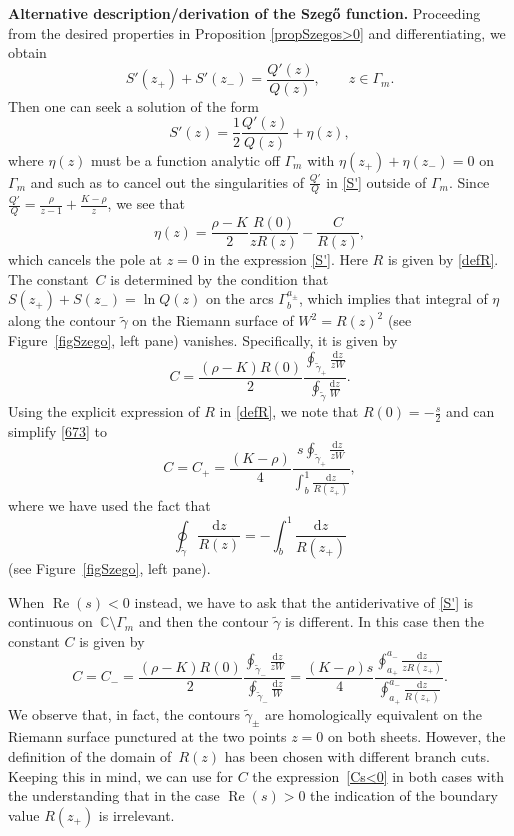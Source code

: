 \documentclass[10pt,a4paper]{amsart}
\numberwithin{equation}{section}
\theoremstyle{definition}
\def \wt{ \widetilde }
\def \d{{\mathrm d}}
\def\be{\begin{equation}}
\def\ee{\end{equation}}
\def\C{{\mathbb C}}
\def \Re{\operatorname{Re} }
\def\la{\label}
\begin{document}
{\bf Alternative description/derivation of the Szeg\H{o} function.}
Proceeding from the desired properties in Proposition \eqref{propSzegos>0} and differentiating, we obtain
\[
S'(z_+)+S'(z_-) = \frac {Q'(z)}{Q(z)}, \qquad z\in \Gamma_m.
\]
Then one can seek a solution of the form
\be
\label{S'}
S'(z)=\frac 1 2 \frac {Q'(z)}{Q(z)} + \eta(z),
\ee
where $\eta(z)$ must be a function analytic off $\Gamma_m$ with $\eta(z_+)+ \eta(z_-)= 0$ on $\Gamma_m$ and such as to cancel out the singularities of $\frac {Q'}Q$ in \eqref{S'} outside of $\Gamma_m$.
Since $\frac {Q'}Q = \frac { {\rho}}{z-1} + \frac{ {K} - {\rho}} z$, we see that
\[
\eta(z) = \frac { {\rho} - {K}} 2 \frac{R(0)}{z R(z)} - \frac C{R(z)},
\]
which cancels the pole at $z=0$ in the expression \eqref{S'}. Here $R$ is given by \eqref{defR}.
The constant~$C$ is determined by the condition that $S(z_+)+S(z_-)= \ln Q(z)$ on the arcs $\Gamma_{b}^{a_\pm}$, which implies that integral of $\eta$ along the contour $\wt \gamma$ on the Riemann surface of $W^2=R(z)^2$ (see Figure~\ref{figSzego}, left pane) vanishes. Specifically, it is given by
\be
C= \frac {{( {\rho} - {K})} R(0)}2\frac{\oint_{\wt \gamma_+} \frac {\d z}{z W}}{\oint_{\wt \gamma} \frac {\d z}{W}}.
\la{673}
\ee
Using the explicit expression of $R$ in \eqref{defR}, we note that $R(0) = -\frac{s}2$ and can simplify \eqref{673} to
\[
C=C_+= \frac { ( {K} - {\rho})}{4} \frac {s \oint_{\wt \gamma_+} \frac {\d z}{z W} }{\int_b^1 \frac {\d z}{ R(z_+)}},
\]
where we have used the fact that {\samepage
\[
\oint_{\wt \gamma} \frac {\d z}{R(z)} = - \int_{b}^1 \frac {\d z}{R(z_+)}
\] (see Figure~\ref{figSzego}, left pane).}

When $\Re(s)<0$ instead, we have to ask that the antiderivative of \eqref{S'} is continuous on~$\C \setminus \Gamma_m$ and then the contour $\wt \gamma$ is different.
In this case then the constant $C$ is given by
\be
C=C_-= \frac {{ ( {\rho} - {K})} R(0)}2\frac{\oint_{\wt \gamma_-} \frac {\d z}{z W}}{\oint_{\wt \gamma_-} \frac {\d z}{W}}
=\frac {{ ( {K} - {\rho})} s }4\frac{\oint_{a_+}^{a_-} \frac {\d z}{z R(z_+)}}{\oint_{a_+}^{a_-} \frac {\d z}{R(z_+)}}.\label{Cs<0}
\ee
We observe that, in fact, the contours $\wt\gamma_\pm$ are homologically equivalent on the Riemann surface punctured at the two points $z=0$ on both sheets. However, the definition of the domain of~$R(z)$ has been chosen with different branch cuts. Keeping this in mind, we can use for $C$ the expression~\eqref{Cs<0} in both cases with the understanding that in the case $\Re (s)>0$ the indication of the boundary value $R(z_+)$ is irrelevant.
\end{document}
